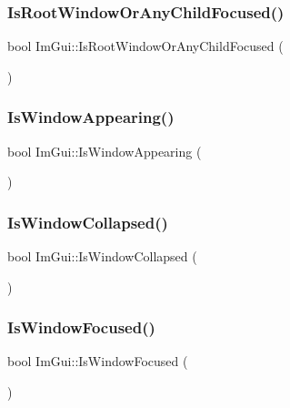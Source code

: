 \subsubsection{\texorpdfstring{Is\+Root\+Window\+Or\+Any\+Child\+Focused()}{IsRootWindowOrAnyChildFocused()}}
{\footnotesize\ttfamily bool Im\+Gui\+::\+Is\+Root\+Window\+Or\+Any\+Child\+Focused (\begin{DoxyParamCaption}{ }\end{DoxyParamCaption})}

\mbox{\label{namespace_im_gui_a99fd14154aae264087d471132e56a42e}} 
\subsubsection{\texorpdfstring{Is\+Window\+Appearing()}{IsWindowAppearing()}}
{\footnotesize\ttfamily bool Im\+Gui\+::\+Is\+Window\+Appearing (\begin{DoxyParamCaption}{ }\end{DoxyParamCaption})}

\mbox{\label{namespace_im_gui_a2a6492aea9013c0078fc530a66e11768}} 
\subsubsection{\texorpdfstring{Is\+Window\+Collapsed()}{IsWindowCollapsed()}}
{\footnotesize\ttfamily bool Im\+Gui\+::\+Is\+Window\+Collapsed (\begin{DoxyParamCaption}{ }\end{DoxyParamCaption})}

\mbox{\label{namespace_im_gui_a1bc0d66039324e071c7d1ae20f9b1211}} 
\subsubsection{\texorpdfstring{Is\+Window\+Focused()}{IsWindowFocused()}}
{\footnotesize\ttfamily bool Im\+Gui\+::\+Is\+Window\+Focused (\begin{DoxyParamCaption}{ }\end{DoxyParamCaption})}

